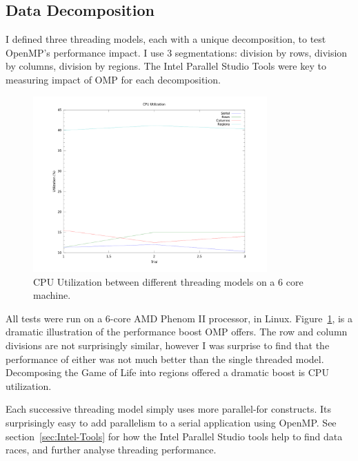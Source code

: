 \documentclass[journal,10pt,onecolumn]{IEEEtran}
\begin{document}
\subsection{Data Decomposition}
I defined three threading models, each with a unique decomposition, to test OpenMP's performance impact.
I use 3 segmentations: division by rows, division by columns, 
division by regions.  The Intel Parallel Studio Tools were key to measuring impact of OMP
for each decomposition. 

\begin{figure}[!h]
\begin{center}
\includegraphics[width=0.8\textwidth]{figures/utilization_compared.png}
\caption{CPU Utilization between different threading models on a 6 core machine.}
\label{fig:gol_cpu_utilization}
\end{center}
\end{figure}

All tests were run on a 6-core AMD Phenom II processor, in Linux. Figure~\ref{fig:gol_cpu_utilization},
is a dramatic illustration of the performance boost OMP offers.  The row and column divisions are not 
surprisingly similar, however I was surprise to find that the performance of either was not much better 
than the single threaded model.  Decomposing the Game of Life into regions offered a dramatic
boost is CPU utilization.

Each successive threading model simply uses more parallel-for constructs.  Its surprisingly easy
to add parallelism to a serial application using OpenMP.  See section~\ref{sec:Intel-Tools} for how the 
Intel Parallel Studio tools help to find data races, and further analyse threading performance.
\end{document}
